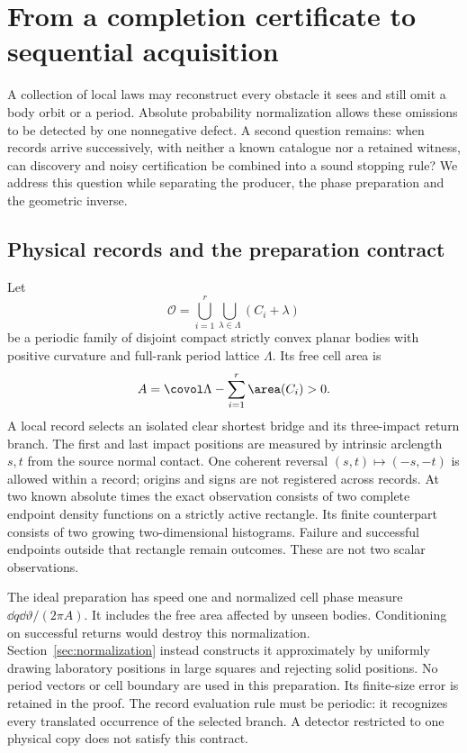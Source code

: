 \section{From a completion certificate to sequential acquisition}
\label{sec:setting}
A collection of local laws may reconstruct every obstacle it sees and
still omit a body orbit or a period. Absolute probability normalization
allows these omissions to be detected by one nonnegative defect. A second
question remains: when records arrive successively, with neither a known
catalogue nor a retained witness, can discovery and noisy certification
be combined into a sound stopping rule? We address this question while
separating the producer, the phase preparation and the geometric inverse.

\subsection{Physical records and the preparation contract}
Let
\[
 \mathcal O=\bigcup_{i=1}^r\bigcup_{\lambda\in\Lambda}(C_i+\lambda)
\]
be a periodic family of disjoint compact strictly convex planar bodies
with positive curvature and full-rank period lattice $\Lambda$. Its
free cell area is
\begin{equation}\label{eq:area-budget}
 A=\covol\Lambda-\sum_{i=1}^r\area(C_i)>0.
\end{equation}
A local record selects an isolated clear shortest bridge and its
three-impact return branch. The first and last impact positions are
measured by intrinsic arclength $s,t$ from the source normal contact.
One coherent reversal $(s,t)\mapsto(-s,-t)$ is allowed within a record;
origins and signs are not registered across records. At two known absolute
times the exact observation consists of two complete endpoint density
functions on a strictly active rectangle. Its finite counterpart consists
of two growing two-dimensional histograms. Failure and successful endpoints
outside that rectangle remain outcomes. These are not two scalar observations.

The ideal preparation has speed one and normalized cell phase measure
$\dd q\dd\vartheta/(2\pi A)$. It includes the free area affected by
unseen bodies. Conditioning on successful returns would destroy this
normalization. Section~\ref{sec:normalization} instead constructs it
approximately by uniformly drawing laboratory positions in large squares
and rejecting solid positions. No period vectors or cell boundary are
used in this preparation. Its finite-size error is retained in the proof.
The record evaluation rule must be periodic: it recognizes every translated
occurrence of the selected branch. A detector restricted to one physical
copy does not satisfy this contract.

